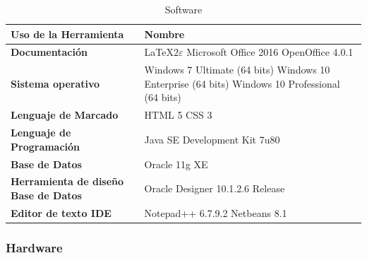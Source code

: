 	    \begin{table}[!ht]
        \centering
        \caption{Software} \label{table:software}
        \begin{tabularx}{\textwidth}{|X|X|}
        	\hline
            \bf Uso de la Herramienta & {\bf Nombre} \\
            \hline
            {\bf Documentación} & {\LaTeX $2\varepsilon$} \newline 
                                  {Microsoft Office 2016} \newline
                                  {OpenOffice 4.0.1}\\
            \hline
            {\bf Sistema operativo} & {Windows 7 Ultimate (64 bits)} \newline
			 						  {Windows 10 Enterprise (64 bits)} \newline
             						  {Windows 10 Professional (64 bits)}\\
            \hline
            {\bf Lenguaje de Marcado} & {HTML 5} \newline
             							{CSS 3}\\ 
            \hline
            {\bf Lenguaje de Programación}& {Java SE Development Kit 7u80}\\
            
            \hline
            {\bf Base de Datos} & {Oracle 11g XE}\\
            \hline
            {\bf Herramienta de diseño Base de Datos} & {Oracle Designer 10.1.2.6 Release}\\
            \hline
            {\bf Editor de texto IDE} & {Notepad++ 6.7.9.2} \newline
                     					{Netbeans 8.1}\\
            \hline	
            \end{tabularx}       
        \end{table}  
    \subsubsection{Hardware}
    	
